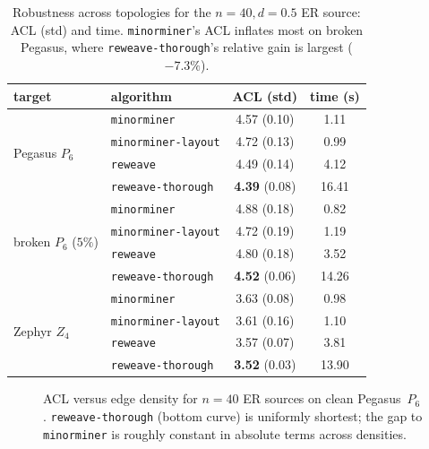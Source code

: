 \documentclass[acmsmall,anonymous,nonacm]{acmart}
\begin{document}
\begin{table}[t]
\caption{Robustness across topologies for the $n{=}40,d{=}0.5$ ER source: ACL
(std) and time. \texttt{minorminer}'s ACL inflates most on broken Pegasus, where
\texttt{reweave-thorough}'s relative gain is largest ($-7.3\%$).}
\label{tab:robust}
\small
\begin{tabular}{llcc}
\toprule
target & algorithm & ACL (std) & time (s) \\
\midrule
\multirow{4}{*}{Pegasus $P_6$}
 & \texttt{minorminer}          & 4.57 (0.10) & 1.11 \\
 & \texttt{minorminer-layout}   & 4.72 (0.13) & 0.99 \\
 & \texttt{reweave}          & 4.49 (0.14) & 4.12 \\
 & \texttt{reweave-thorough} & \textbf{4.39} (0.08) & 16.41 \\
\midrule
\multirow{4}{*}{broken $P_6$ ($5\%$)}
 & \texttt{minorminer}          & 4.88 (0.18) & 0.82 \\
 & \texttt{minorminer-layout}   & 4.72 (0.19) & 1.19 \\
 & \texttt{reweave}          & 4.80 (0.18) & 3.52 \\
 & \texttt{reweave-thorough} & \textbf{4.52} (0.06) & 14.26 \\
\midrule
\multirow{4}{*}{Zephyr $Z_4$}
 & \texttt{minorminer}          & 3.63 (0.08) & 0.98 \\
 & \texttt{minorminer-layout}   & 3.61 (0.16) & 1.10 \\
 & \texttt{reweave}          & 3.57 (0.07) & 3.81 \\
 & \texttt{reweave-thorough} & \textbf{3.52} (0.03) & 13.90 \\
\bottomrule
\end{tabular}
\end{table}

\begin{figure}[t]
\centering
{}
\caption{ACL versus edge density for $n{=}40$ ER sources on clean Pegasus~$P_6$.
\texttt{reweave-thorough} (bottom curve) is uniformly shortest; the gap to
\texttt{minorminer} is roughly constant in absolute terms across densities.}
\label{fig:density}
\end{figure}
\end{document}
